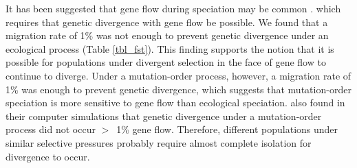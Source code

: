 \begin{doublespace}
It has been suggested that gene flow during speciation
may be common \citetext{\citealt{coy04}, p. 112; \citealt{nos08}}.
which requires that genetic divergence with gene flow be possible.
%
We found that a migration rate of 1\% was not enough to prevent
genetic divergence under an ecological process (Table \ref{tbl_fst}).
%
This finding supports the notion that it is possible for populations
under divergent selection in the face of gene flow to continue to diverge.
%
Under a mutation-order process, however, a migration rate of 1\%
was enough to prevent genetic divergence,
which suggests that mutation-order speciation
is more sensitive to gene flow than ecological speciation.
%
\cite{nos11} also found in their computer simulations
that genetic divergence under a mutation-order process
did not occur $>$~1\% gene flow.
%
Therefore, different populations under similar selective pressures
probably require almost complete isolation for divergence to occur.










\end{doublespace}
